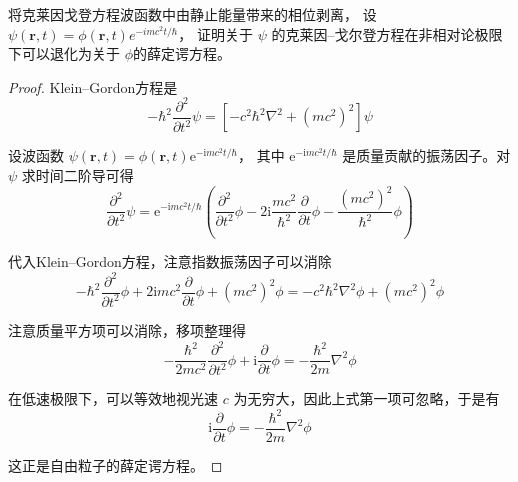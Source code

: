 \begin{4}
    将克莱因戈登方程波函数中由静止能量带来的相位剥离，
    设 $\psi(\mathbf{r}, t)=\phi(\mathbf{r}, t) e^{-i m c^{2} t / \hbar}$，
    证明关于 $\psi$ 的克莱因--戈尔登方程在非相对论极限下可以退化为关于 $\phi$的薛定谔方程。
\end{4}
\begin{proof}
    Klein--Gordon方程是
$$-\hbar^{2} \frac{\partial^{2}}{\partial t^{2}} \psi
=\left[-c^{2} \hbar^{2} \nabla^{2}+\left(m c^{2}\right)^{2}\right] \psi$$

设波函数 $\psi(\mathbf{r}, t)=\phi(\mathbf{r}, t) \mathrm{e}^{-\mathrm{i} m c^{2} t / \hbar}$，
其中 $\mathrm{e}^{-\mathrm{i} m c^{2} t / \hbar}$ 是质量贡献的振荡因子。对 $\psi$ 求时间二阶导可得
$$\frac{\partial^{2}}{\partial t^{2}} \psi
=\mathrm{e}^{-\mathrm{i} m c^{2} t / \hbar}\left(\frac{\partial^{2}}{\partial t^{2}} \phi-2 \mathrm{i} \frac{m c^{2}}{\hbar^{2}} \frac{\partial}{\partial t} \phi-\frac{\left(m c^{2}\right)^{2}}{\hbar^{2}} \phi\right)$$

代入Klein--Gordon方程，注意指数振荡因子可以消除
$$-\hbar^{2} \frac{\partial^{2}}{\partial t^{2}} \phi+2 \mathrm{i} m c^{2} \frac{\partial}{\partial t} \phi+\left(m c^{2}\right)^{2} \phi
=-c^{2} \hbar^{2} \nabla^{2} \phi+\left(m c^{2}\right)^{2} \phi$$

注意质量平方项可以消除，移项整理得
$$-\frac{\hbar^{2}}{2 m c^{2}} \frac{\partial^{2}}{\partial t^{2}} \phi+\mathrm{i} \frac{\partial}{\partial t} \phi
=-\frac{\hbar^{2}}{2 m} \nabla^{2} \phi$$

在低速极限下，可以等效地视光速 $c$ 为无穷大，因此上式第一项可忽略，于是有
$$\mathrm{i} \frac{\partial}{\partial t} \phi
=-\frac{\hbar^{2}}{2 m} \nabla^{2} \phi$$

这正是自由粒子的薛定谔方程。
\end{proof}
